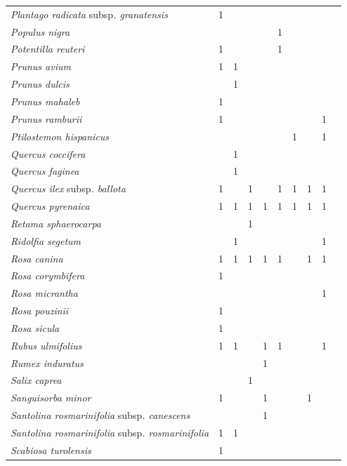 {\begin{longtable}{llllllllll}
\textit{Plantago radicata }subsp\textit{. granatensis}  & 1 &  &  &  &  &  &  &  \\
\textit{Populus nigra}  &  &  &  &  & 1 &  &  &  \\
\textit{Potentilla reuteri}  & 1 &  &  &  & 1 &  &  &  \\
\textit{Prunus avium}  & 1 & 1 &  &  &  &  &  &  \\
\textit{Prunus dulcis}  &  & 1 &  &  &  &  &  &  \\
\textit{Prunus mahaleb}  & 1 &  &  &  &  &  &  &  \\
\textit{Prunus ramburii}  & 1 &  &  &  &  &  &  & 1 \\
\textit{Ptilostemon hispanicus}  &  &  &  &  &  & 1 &  & 1 \\
\textit{Quercus coccifera}  &  & 1 &  &  &  &  &  &  \\
\textit{Quercus faginea}  &  & 1 &  &  &  &  &  &  \\
\textit{Quercus ilex }subsp\textit{. ballota}  & 1 &  & 1 &  & 1 & 1 & 1 & 1 \\
\textit{Quercus pyrenaica}  & 1 & 1 & 1 & 1 & 1 & 1 & 1 & 1 \\
\textit{Retama sphaerocarpa}  &  &  & 1 &  &  &  &  &  \\
\textit{Ridolfia segetum}  &  & 1 &  &  &  &  &  & 1 \\
\textit{Rosa canina}  & 1 & 1 & 1 & 1 & 1 &  & 1 & 1 \\
\textit{Rosa corymbifera}  & 1 &  &  &  &  &  &  &  \\
\textit{Rosa micrantha}  &  &  &  &  &  &  &  & 1 \\
\textit{Rosa pouzinii}  & 1 &  &  &  &  &  &  &  \\
\textit{Rosa sicula}  & 1 &  &  &  &  &  &  &  \\
\textit{Rubus ulmifolius}  & 1 & 1 &  & 1 & 1 &  &  & 1 \\
\textit{Rumex induratus}  &  &  &  & 1 &  &  &  &  \\
\textit{Salix caprea}  &  &  & 1 &  &  &  &  &  \\
\textit{Sanguisorba minor}  & 1 &  &  & 1 &  &  & 1 &  \\
\textit{Santolina rosmarinifolia }subsp\textit{. canescens}  &  &  &  & 1 &  &  &  &  \\
\textit{Santolina rosmarinifolia }subsp\textit{. rosmarinifolia}  & 1 & 1 &  &  &  &  &  &  \\
\textit{Scabiosa turolensis}  & 1 &  &  &  &  &  &  &  \\

\end{longtable}}
